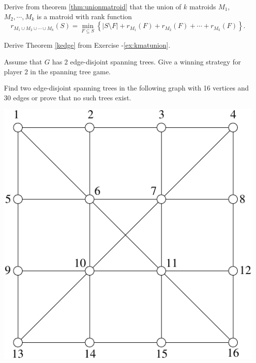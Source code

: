 \documentclass[12pt]{article}
\begin{document}
\begin{exercises}
\item \label{ex:kmatunion}
Derive from theorem \ref{thm:unionmatroid} that the union of
$k$ matroids $M_1$, $M_2, \cdots, M_k$ is a matroid with rank function 
$$r_{M_1\cup M_2\cup \cdots \cup M_k}(S)=\min_{F \subseteq S} \left\{ |S \setminus F| +
  r_{M_1}(F) + r_{M_2} (F) + \cdots + r_{M_k}(F)\right\}.$$
 
\item
Derive Theorem \ref{kedge} from Exercise -\ref{ex:kmatunion}.
\item \label{ex:stg2}
Assume that $G$ has 2 edge-disjoint spanning trees. Give a winning
strategy for player 2 in the spanning tree game. 
\item
Find two edge-disjoint spanning trees in the following graph with 16
vertices and 30 edges or prove that no such trees exist. 
\begin{center}
\includegraphics{../figures/mst-game}
\end{center}
\end{exercises}
\end{document}
